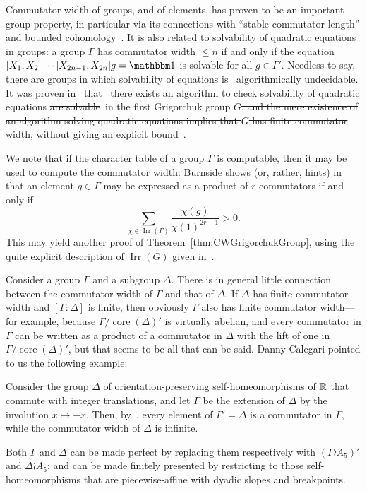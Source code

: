 \documentclass[a4paper,11pt]{amsart}
\newcommand\replace[2]{\st{#1}{\color{Green4}\ #2}}
\begin{document}
Commutator width of groups, and of elements, has proven to be an
important group property, in particular via its connections with
``stable commutator length'' and bounded
cohomology~\cite{Calegari:SCL}. It is also related to solvability of
quadratic equations in groups: a group $\Gamma$ has commutator width
$\le n$ if and only if the equation
$[X_1,X_2]\cdots[X_{2n-1},X_{2n}]g=\id$ is solvable for all
$g\in\Gamma'$. Needless to say, there are groups in which solvability
of equations is \replace{}{algorithmically} undecidable. It was proven
in~\cite{Lysenok-Miasnikov-Ushakov:QuadraticEquationsInGrig} that 
\replace{}{there exists an algorithm to check solvability of} quadratic equations \replace{are
solvable} in the first Grigorchuk group $G$\replace{, and the mere existence of
an algorithm solving quadratic equations implies that $G$ has finite
commutator width, without giving an explicit bound}.

We note that if the character table of a group $\Gamma$ is computable,
then it may be used to compute the commutator width: Burnside shows
(or, rather, hints) in~\cite[\S238, Ex. 7]{Burnside:Groups} that an
element $g\in\Gamma$ may be expressed as a product of $r$ commutators
if and only if
\[\sum_{\chi\in\operatorname{Irr}(\Gamma)}\frac{\chi(g)}{\chi(1)^{2r-1}}>0.\]
This may yield another proof of Theorem~\ref{thm:CWGrigorchukGroup},
using the quite explicit description of $\operatorname{Irr}(G)$ given
in~\cite{Bartholdi:RepresentationZetaFunctions}.

Consider a group $\Gamma$ and a subgroup $\Delta$. There is in general
little connection between the commutator width of $\Gamma$ and that of
$\Delta$. If $\Delta$ has finite commutator width and
$[\Gamma:\Delta]$ is finite, then obviously $\Gamma$ also has finite
commutator width---for example, because
$\Gamma/\operatorname{core}(\Delta)'$ is virtually abelian, and every
commutator in $\Gamma$ can be written as a product of a commutator in
$\Delta$ with the lift of one in
$\Gamma/\operatorname{core}(\Delta)'$, but that seems to be all that
can be said. Danny Calegari pointed to us the following example:
\begin{ex}\label{ex:commwidthsubgroup}
  Consider the group $\Delta$ of orientation-preserving
  self-homeomorphisms of $\mathbb{R}$ that commute with integer translations,
  and let $\Gamma$ be the extension of $\Delta$ by the involution
  $x\mapsto-x$. Then, by~\cite[Theorems~2.3
  and~2.4]{Eisenbud-Hirsch-Neumann:SeifertBundles}, every element of
  $\Gamma'=\Delta$ is a commutator in $\Gamma$, while the commutator
  width of $\Delta$ is infinite.

  Both $\Gamma$ and $\Delta$ can be made perfect by replacing them
  respectively with $(\Gamma\wr A_5)'$ and $\Delta\wr A_5$; and can be
  made finitely presented by restricting to those self-homeo\-mor\-phisms
  that are piecewise-affine with dyadic slopes and breakpoints.
\end{ex}
\end{document}
